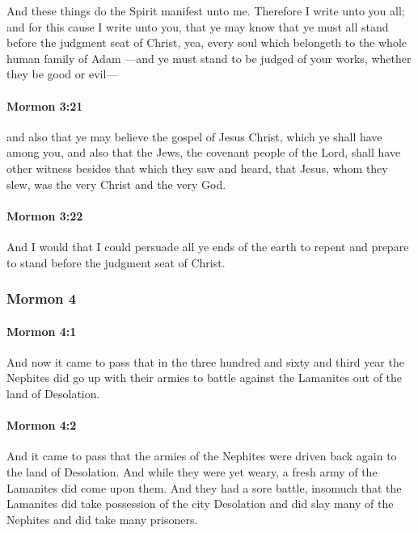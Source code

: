 			And these things do the Spirit manifest unto me.
			Therefore I write unto you all;
			and for this cause I write unto you,
			that ye may know that ye must all stand before the judgment seat of Christ,
			yea, every soul which belongeth to the whole human family of Adam
			---and ye must stand to be judged of your works,
			whether they be good or evil---

		\paragraph{Mormon 3:21} %
			\label{MORMON-3-21}

			and also that ye may believe the gospel of Jesus Christ,
			which ye shall have among you,
			and also that the Jews, the covenant people of the Lord,
			shall have other witness besides that which they saw and heard,
			that Jesus, whom they slew, was the very Christ and the very God.

		\paragraph{Mormon 3:22} %
			\label{MORMON-3-22}

			And I would that I could persuade all ye ends of the earth
			to repent and prepare to stand before the judgment seat of Christ.

	\subsubsection{Mormon 4} %
		\label{MORMON-4}
		
		\paragraph{Mormon 4:1} %
			\label{MORMON-4-1}

			And now it came to pass that in the three hundred and sixty and third year
			the Nephites did go up with their armies to battle against the Lamanites
			out of the land of Desolation.

		\paragraph{Mormon 4:2} %
			\label{MORMON-4-2}

			And it came to pass that
			the armies of the Nephites were driven back again to the land of Desolation.
			And while they were yet weary,
			a fresh army of the Lamanites did come upon them.
			And they had a sore battle,
			insomuch that the Lamanites did take possession of the city Desolation
			and did slay many of the Nephites and did take many prisoners.

